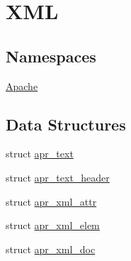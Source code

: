 \hypertarget{group___a_p_r___util___x_m_l}{\section{X\-M\-L}
\label{group___a_p_r___util___x_m_l}
}
\subsection*{Namespaces}
\begin{DoxyCompactItemize}
\item 
\hyperlink{namespace_apache}{Apache}
\end{DoxyCompactItemize}
\subsection*{Data Structures}
\begin{DoxyCompactItemize}
\item 
struct \hyperlink{structapr__text}{apr\-\_\-text}
\item 
struct \hyperlink{structapr__text__header}{apr\-\_\-text\-\_\-header}
\item 
struct \hyperlink{structapr__xml__attr}{apr\-\_\-xml\-\_\-attr}
\item 
struct \hyperlink{structapr__xml__elem}{apr\-\_\-xml\-\_\-elem}
\item 
struct \hyperlink{structapr__xml__doc}{apr\-\_\-xml\-\_\-doc}
\end{DoxyCompactItemize}

